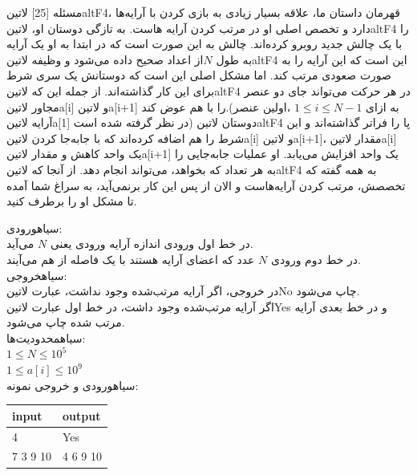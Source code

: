 ‌مسئله [25]
	‌لاتین{altF4}، قهرمان داستان ما، علاقه بسیار زیادی به بازی کردن با آرایه‌ها دارد و تخصص اصلی او
	در مرتب کردن آرایه هاست. به تازگی دوستان او، ‌لاتین{altF4} را با یک چالش جدید روبرو کرده‌اند.
	چالش به این صورت است که در ابتدا به او یک آرایه به طول $N$از اعداد صحیح داده می‌شود و وظیفه ‌لاتین{altF4}
	این است که این آرایه را به صورت صعودی مرتب کند. اما مشکل اصلی این است که دوستانش یک سری شرط برای 
	این کار گذاشته‌اند. از جمله این که ‌لاتین{altF4} در هر حرکت می‌تواند جای دو عنصر مجاور ‌لاتین{a[i]}	و ‌لاتین{a[i+1]} را با هم عوض کند.(به ازای
	$1 \leq i \leq N-1 $
	،اولین عنصر آرایه ‌لاتین{a[1]} در نظر گرفته شده است)
	دوستان ‌لاتین{altF4} پا را فراتر گذاشته‌اند و این شرط را هم اضافه کرده‌اند که با جابه‌جا کردن 
	‌لاتین{a[i]} و ‌لاتین{a[i+1]}، مقدار ‌لاتین{a[i]} یک واحد کاهش و مقدار ‌لاتین{a[i+1]} 
	یک واحد افزایش می‌یابد. او عملیات جا‌به‌جایی را به هر تعداد که بخواهد، می‌تواند انجام دهد. از آنجا 
	که ‌لاتین{altF4} به همه گفته که تخصصش، مرتب کردن آرایه‌هاست و الان از پس این کار برنمی‌آید، به
	سراغ شما آمده تا مشکل او را برطرف کنید.
	
	‌سیاه{ورودی:}\\
	در خط اول ورودی اندازه آرایه ورودی یعنی $N$ می‌آید.\\
	در خط دوم ورودی $N$ عدد که اعضای آرایه هستند با یک فاصله از هم می‌آیند.\\
	‌سیاه{خروجی:}\\
	در خروجی، اگر آرایه مرتب‌شده وجود نداشت، عبارت ‌لاتین{No} چاپ می‌شود.\\
	اگر آرایه مرتب‌شده وجود داشت، در خط اول عبارت  ‌لاتین{Yes} و در خط بعدی آرایه مرتب شده چاپ می‌شود.\\
	‌سیاه{محدودیت‌ها:}\\
	$1 \leq N \leq 10^5$\\
	$1 \leq a[i] \leq 10^9$\\
	‌سیاه{ورودی و خروجی نمونه:}\\
	\begin{latin}
		\begin{tabularx}{\textwidth}{|X | X|}
			\hline
			\textbf{input} &
			\textbf{output}\\
			\hline
			4&
			Yes\\
			7 3 9 10 &
			4 6 9 10\\
			\hline
		
		\end{tabularx}
	\end{latin}

